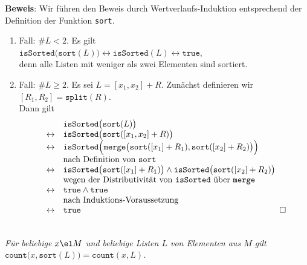 \noindent
\textbf{Beweis}: Wir f\"uhren den Beweis durch Wertverlaufs-Induktion entsprechend der Definition
der Funktion \texttt{sort}.
\begin{enumerate}
\item Fall: $\#L < 2$.  Es gilt \\[0.1cm]
      \hspace*{1.3cm} 
      $\mathtt{isSorted}\bigl(\mathtt{sort}(L)\bigr) \leftrightarrow \mathtt{isSorted}(L) \leftrightarrow \mathtt{true}$, \\[0.1cm]
      denn alle Listen mit weniger als zwei Elementen sind sortiert.
\item Fall: $\#L \geq 2$. Es sei $L = [x_1,x_2] + R$.  Zun\"achst definieren wir \\[0.1cm]
      \hspace*{1.3cm} $[R_1,R_2] = \mathtt{split}(R)$. \\[0.1cm]
      Dann gilt 
      \[
      \begin{array}[b]{cl}
                      & \mathtt{isSorted}\bigl(\mathtt{sort}(L)\bigr) \\
      \leftrightarrow & \mathtt{isSorted}\bigl(\mathtt{sort}([x_1,x_2] + R)\bigr) \\
      \leftrightarrow & \mathtt{isSorted}\Bigl(\mathtt{merge}\bigl(\mathtt{sort}([x_1] + R_1), \mathtt{sort}([x_2] + R_2)\bigr)\Bigr) \\
                      & \mbox{nach Definition von \texttt{sort}} \\
      \leftrightarrow & \mathtt{isSorted}\bigl(\mathtt{sort}([x_1] + R_1)\bigr) \wedge \mathtt{isSorted}\bigl(\mathtt{sort}([x_2] + R_2)\bigr) \\
                      & \mbox{wegen der Distributivit\"at von \texttt{isSorted} \"uber \texttt{merge}} \\
      \leftrightarrow & \mathtt{true} \wedge \mathtt{true} \\
                      & \mbox{nach Induktions-Voraussetzung} \\
      \leftrightarrow & \mathtt{true} 
      \end{array}\hspace*{\fill} \Box
      \]
\end{enumerate}

\begin{Satz} \hspace*{\fill} \\
{\em
  F\"ur beliebige $x\el M$ und beliebige Listen $L$ von Elementen aus $M$ gilt \\[0.1cm]
  \hspace*{1.3cm} $\mathtt{count}\bigl(x,\mathtt{sort}(L)\bigr) = \mathtt{count}(x,L)$.
}
\end{Satz}

